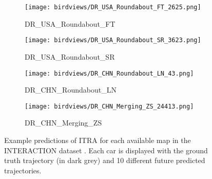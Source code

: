 \documentclass[letterpaper, 10 pt, conference]{ieeeconf}
\begin{document}
\begin{figure*}[t]
    \hfill
    \begin{subfigure}[b]{0.31\textwidth}
        \centering
        \texttt{[image: birdviews/DR\_USA\_Roundabout\_FT\_2625.png]}
        \caption{DR\_USA\_Roundabout\_FT}
    \end{subfigure}
    \hfill
    \begin{subfigure}[b]{0.31\textwidth}
        \centering
        \texttt{[image: birdviews/DR\_USA\_Roundabout\_SR\_3623.png]}
        \caption{DR\_USA\_Roundabout\_SR}
    \end{subfigure}
    \hfill
    \begin{subfigure}[b]{0.31\textwidth}
        \centering
        \texttt{[image: birdviews/DR\_CHN\_Roundabout\_LN\_43.png]}
        \caption{DR\_CHN\_Roundabout\_LN}
    \end{subfigure}
    \hspace{1em}
    \begin{subfigure}[b]{0.31\textwidth}
        \centering
        \texttt{[image: birdviews/DR\_CHN\_Merging\_ZS\_24413.png]}
        \caption{DR\_CHN\_Merging\_ZS}
    \end{subfigure}
    \caption{Example predictions of ITRA for each available map in the INTERACTION dataset \cite{zhan_interaction_2019}. Each car is displayed with the ground truth trajectory (in dark grey) and 10 different future predicted trajectories.}
    \label{fig:birdview_examples}
\end{figure*}
\end{document}
